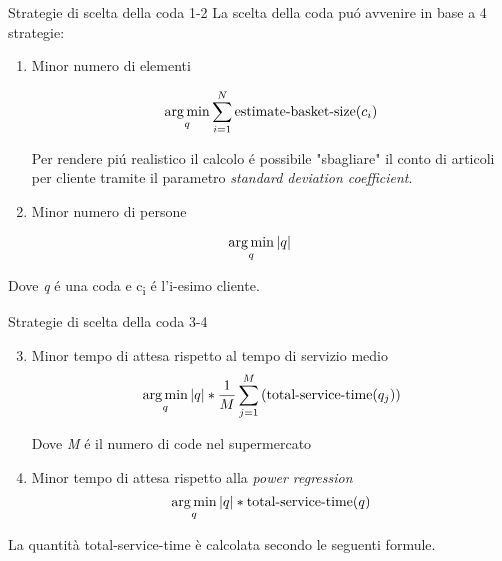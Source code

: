 \begin{frame}{Strategie di scelta della coda 1-2}
  La scelta della coda puó avvenire in base a 4 strategie:
  \begin{enumerate}
  \item Minor numero di elementi

    \begin{equation}
      \operatorname*{arg\,min}_q \sum\limits_{i=1}^N \text{estimate-basket-size}(c_i) 
    \end{equation}

    Per rendere piú realistico il calcolo é possibile "sbagliare"
    il conto di articoli per cliente tramite il parametro
    \textit{standard deviation coefficient}.
    
  \item Minor numero di persone
   \end{enumerate}
   
   \begin{equation}
     \operatorname*{arg\,min}_q |q|
   \end{equation}

   Dove \textit{q} é una coda e c\textsubscript{i} é l'i-esimo
   cliente.   
 \end{frame}

\begin{frame}{Strategie di scelta della coda 3-4}
  \begin{enumerate}
    \setcounter{enumi}{2}

  \item Minor tempo di attesa rispetto al tempo di servizio medio
    \begin{equation}
      \operatorname*{arg\,min}_q |q| * \frac{1}{M}\sum\limits_{j=1}^M \left( \text{total-service-time}(q_j) \right)
    \end{equation}

    Dove \textit{M} é il numero di code nel supermercato
    
\item Minor tempo di attesa rispetto alla \textit{power regression}
  \begin{equation}
    \operatorname*{arg\,min}_q |q| * \text{total-service-time}(q)
  \end{equation}
\end{enumerate}
La quantità total-service-time è calcolata secondo le seguenti formule.
\end{frame}

